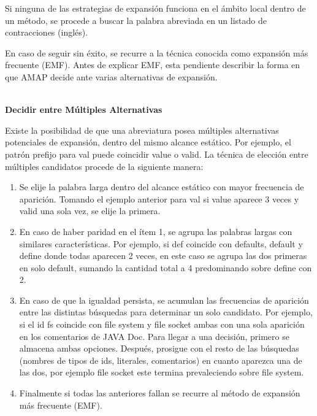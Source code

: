 Si ninguna de las estrategias de expansión funciona en el ámbito local dentro de un método, se procede a buscar la palabra abreviada en un listado de contracciones (inglés).

En caso de seguir sin éxito, se recurre a la técnica conocida como expansión más frecuente (EMF).
Antes de explicar EMF, esta pendiente describir la forma en que AMAP decide ante varias alternativas de expansión.

\noindent \textbf{\\Decidir entre Múltiples Alternativas\\}

Existe la posibilidad de que una abreviatura posea múltiples alternativas potenciales de expansión, dentro del mismo alcance estático. Por ejemplo, el patrón prefijo para \textsf{val} puede coincidir \textsf{value} o \textsf{valid}. La técnica de elección entre múltiples candidatos procede de la siguiente manera:

\begin{enumerate}
\itemsep0em%
\item Se elije la palabra larga dentro del alcance estático con mayor frecuencia de aparición. Tomando el ejemplo anterior para \textsf{val} si \textsf{value} aparece 3 veces y \textsf{valid} una sola vez, se elije la primera.

\item En caso de haber paridad en el ítem 1, se agrupa las palabras largas con similares características. Por ejemplo, si \textsf{def} coincide con \textsf{defaults}, \textsf{default} y \textsf{define} donde todas aparecen 2 veces, en este caso se agrupa las dos primeras en solo \textsf{default}, sumando la cantidad total a 4 predominando sobre \textsf{define} con 2.

\item En caso de que la igualdad persista, se acumulan las frecuencias de aparición entre las distintas búsquedas para determinar un solo candidato. Por ejemplo, si el id \textsf{fs} coincide con \textsf{file system} y \textsf{file socket} ambas con una sola aparición en los comentarios de JAVA Doc. Para llegar a una decisión, primero se almacena ambas opciones. Después, prosigue con el resto de las búsquedas (nombres de tipos de ids, literales, comentarios) en cuanto aparezca una de las dos, por ejemplo \textsf{file socket} este termina prevaleciendo sobre \textsf{file system}.

\item Finalmente si todas las anteriores fallan se recurre al método de expansión más frecuente (EMF). 

\end{enumerate}


